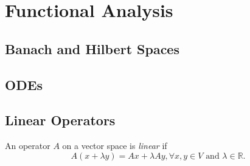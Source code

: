 \documentclass[a4paper]{book}
\def\R{\mathbb{R}}
\begin{document}
\part{Functional Analysis}
\chapter{Banach and Hilbert Spaces}
\chapter{ODEs}
\chapter{Linear Operators}
\begin{myDef}[linear]
    An operator $A$ on a vector space is \emph{linear} if
    \[
        A(x+\lambda y)=Ax+\lambda Ay, \forall x, y \in V \text{ and } \lambda \in \R.
    \]
\end{myDef}
\end{document}

